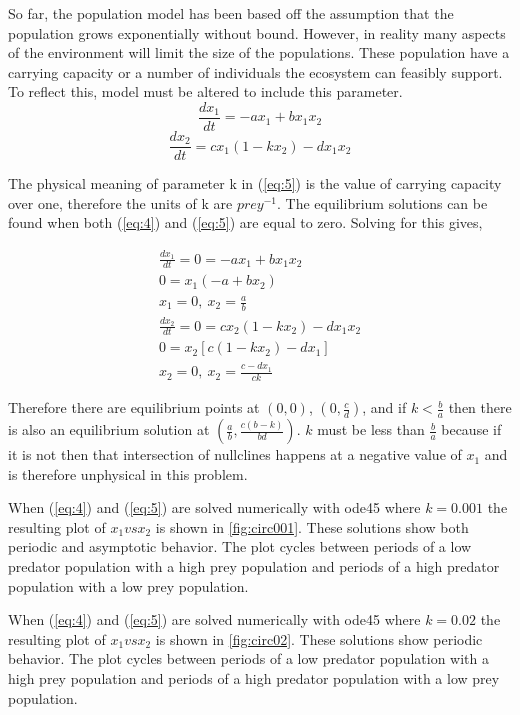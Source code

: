 \documentclass[12pt]{article}   %
\theoremstyle{definition}
\numberwithin{equation}{section}
\begin{document}
\quad So far, the population model has been based off the assumption that the population grows exponentially without bound. However, in reality many aspects of the environment will limit the size of the populations. These population have a carrying capacity or a number of individuals the ecosystem can feasibly support. To reflect this, model must be altered to include this parameter.    
\begin{equation}
  \frac{dx_1}{dt} = -ax_1 + bx_1x_2
  \label{eq:4}
\end{equation}
\begin{equation}
  \frac{dx_2}{dt}= cx_1(1-kx_2) - dx_1x_2 
  \label{eq:5}
\end{equation}

\quad The physical meaning of parameter k in (\ref{eq:5}) is the value of carrying capacity over one, therefore the units of k are $prey^{-1}$.  The equilibrium solutions can be found when both (\ref{eq:4}) and (\ref{eq:5}) are equal to zero.  Solving for this gives,

\begin{align*}
  \frac{dx_1}{dt} =0= -ax_1 + bx_1x_2\\
  0=x_1(-a+bx_2)\\
  x_1=0,\ x_2=\frac{a}{b}\\
  \frac{dx_2}{dt}=0= cx_2(1-kx_2) - dx_1x_2\\
  0=x_2[c(1-kx_2)-dx_1]\\
  x_2=0,\ x_2=\frac{c-dx_1}{ck}
\end{align*}

\quad Therefore there are equilibrium points at $(0,0)$, $(0,\frac{c}{d})$, and if $k<\frac{b}{a}$ then there is also an equilibrium solution at $(\frac{a}{b},\frac{c(b-k)}{bd})$. $k$ must be less than $\frac{b}{a}$ because if it is not then that intersection of nullclines happens at a negative value of $x_1$ and is therefore unphysical in this problem.

\quad When (\ref{eq:4}) and (\ref{eq:5}) are solved numerically with ode45 where $k=0.001$ the resulting plot of $x_1 vs x_2$ is shown in \autoref{fig:circ001}.  These solutions show both periodic and asymptotic behavior. The plot cycles between periods of a low predator population with a high prey population and periods of a high predator population with a low prey population. 

\quad When (\ref{eq:4}) and (\ref{eq:5}) are solved numerically with ode45 where $k=0.02$ the resulting plot of $x_1 vs x_2$ is shown in \autoref{fig:circ02}.  These solutions show periodic behavior. The plot cycles between periods of a low predator population with a high prey population and periods of a high predator population with a low prey population. 
\end{document}
